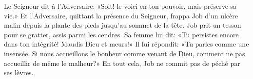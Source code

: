 Le Seigneur dit à l’Adversaire:
	«Soit! le voici en ton pouvoir, mais préserve sa vie.»
Et l’Adversaire, quittant la présence du Seigneur,
	frappa Job d’un ulcère malin depuis la plante des pieds jusqu’au sommet de la tête.
Job prit un tesson pour se gratter, assis parmi les cendres.
Sa femme lui dit: «Tu persistes encore dans ton intégrité! Maudis Dieu et meurs!»
Il lui répondit: «Tu parles comme une insensée.
	Si nous accueillons le bonheur comme venant de Dieu,
	comment ne pas accueillir de même le malheur?»
En tout cela, Job ne commit pas de péché par ses lèvres.
